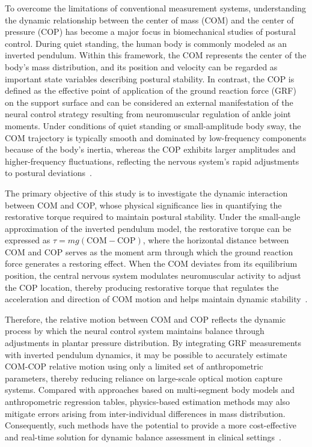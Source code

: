 \documentclass[preprint,12pt]{elsarticle}
\begin{document}
To overcome the limitations of conventional measurement systems, understanding
the dynamic relationship between the center of mass (COM) and the center of
pressure (COP) has become a major focus in biomechanical studies of postural
control.
During quiet standing, the human body is commonly modeled as an inverted pendulum.
Within this framework, the COM represents the center of the body's mass
distribution, and its position and velocity can be regarded as important state
variables describing postural stability.
In contrast, the COP is defined as the effective point of application of the
ground reaction force (GRF) on the support surface and can be considered an
external manifestation of the neural control strategy resulting from neuromuscular
regulation of ankle joint moments.
Under conditions of quiet standing or small-amplitude body sway, the COM
trajectory is typically smooth and dominated by low-frequency components because
of the body's inertia, whereas the COP exhibits larger amplitudes and
higher-frequency fluctuations, reflecting the nervous system's rapid adjustments
to postural deviations~\cite{s23104933,labrozzi2024center}.

The primary objective of this study is to investigate the dynamic interaction
between COM and COP, whose physical significance lies in quantifying the
restorative torque required to maintain postural stability.
Under the small-angle approximation of the inverted pendulum model, the restorative
torque can be expressed as $\tau = mg(\mathrm{COM} - \mathrm{COP})$, where the
horizontal distance between COM and COP serves as the moment arm through which
the ground reaction force generates a restoring effect.
When the COM deviates from its equilibrium position, the central nervous system
modulates neuromuscular activity to adjust the COP location, thereby producing
restorative torque that regulates the acceleration and direction of COM motion and
helps maintain dynamic stability~\cite{labrozzi2024center}.

Therefore, the relative motion between COM and COP reflects the dynamic process
by which the neural control system maintains balance through adjustments in plantar
pressure distribution.
By integrating GRF measurements with inverted pendulum dynamics, it may be
possible to accurately estimate COM-COP relative motion using only a limited set
of anthropometric parameters, thereby reducing reliance on large-scale optical
motion capture systems.
Compared with approaches based on multi-segment body models and anthropometric
regression tables, physics-based estimation methods may also mitigate errors
arising from inter-individual differences in mass distribution.
Consequently, such methods have the potential to provide a more cost-effective and
real-time solution for dynamic balance assessment in clinical
settings~\cite{s23104933,labrozzi2024center}.
\end{document}
